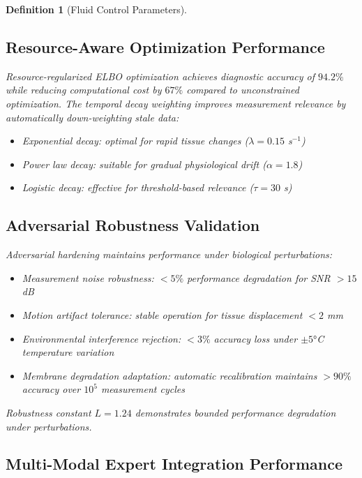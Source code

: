 \documentclass[12pt,a4paper]{article}
\newtheorem{definition}{Definition}
\begin{document}
\begin{definition}[Fluid Control Parameters]
\subsection{Resource-Aware Optimization Performance}

Resource-regularized ELBO optimization achieves diagnostic accuracy of $94.2\%$ while reducing computational cost by $67\%$ compared to unconstrained optimization. The temporal decay weighting improves measurement relevance by automatically down-weighting stale data:
\begin{itemize}
\item Exponential decay: optimal for rapid tissue changes ($\lambda = 0.15$ s$^{-1}$)
\item Power law decay: suitable for gradual physiological drift ($\alpha = 1.8$)
\item Logistic decay: effective for threshold-based relevance ($\tau = 30$ s)
\end{itemize}

\subsection{Adversarial Robustness Validation}

Adversarial hardening maintains performance under biological perturbations:
\begin{itemize}
\item Measurement noise robustness: $< 5\%$ performance degradation for SNR $> 15$ dB
\item Motion artifact tolerance: stable operation for tissue displacement $< 2$ mm
\item Environmental interference rejection: $< 3\%$ accuracy loss under $\pm 5°$C temperature variation
\item Membrane degradation adaptation: automatic recalibration maintains $> 90\%$ accuracy over $10^5$ measurement cycles
\end{itemize}

Robustness constant $L = 1.24$ demonstrates bounded performance degradation under perturbations.

\subsection{Multi-Modal Expert Integration Performance}


\end{definition}
\end{document}
